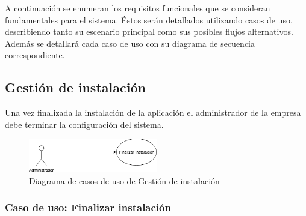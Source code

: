 \documentclass[12pt,a4paperpaper,]{report}
\begin{document}
A continuación se enumeran los requisitos funcionales que se consideran
fundamentales para el sistema. Éstos serán detallados utilizando casos
de uso, describiendo tanto su escenario principal como sus posibles
flujos alternativos. Además se detallará cada caso de uso con su
diagrama de secuencia correspondiente.

\subsection{Gestión de instalación}\label{gestiuxf3n-de-instalaciuxf3n}

Una vez finalizada la instalación de la aplicación el administrador de
la empresa debe terminar la configuración del sistema.

\begin{figure}
\centering
\includegraphics[width=0.50000\textwidth]{source/figures/gestion-instalacion.png}
\caption{Diagrama de casos de uso de Gestión de instalación
\label{gestion_instalacion}}
\end{figure}

\subsubsection{Caso de uso: Finalizar
instalación}\label{caso-de-uso-finalizar-instalaciuxf3n}
\end{document}
